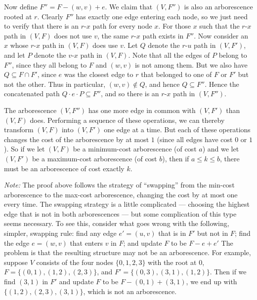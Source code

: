 \documentclass[12pt]{article}
\begin{document}
\begin{enumerate}
{Now define $F'' = F - (w,v) + e$.
We claim that $(V,F'')$ is also an arborescence rooted at $r$.
Clearly $F''$ has exactly one edge entering each node,
so we just need to verify that there is an $r$-$x$
path for every node $x$.
For those $x$ such that the $r$-$x$ path in $(V,F)$ does not
use $v$, the same $r$-$x$ path exists in $F''$.
Now consider an $x$ whose $r$-$x$ path in $(V,F)$ does use $v$.
Let $Q$ denote the $r$-$u$ path in $(V,F')$,
and let $P$ denote the $v$-$x$ path in $(V,F)$.
Note that all the edges of $P$ belong to $F''$, since
they all belong to $F$ and $(w,v)$ is not among them.
But we also have $Q \subseteq F \cap F'$, since
$e$ was the closest edge to $r$ that belonged to one 
of $F$ or $F'$ but not the other.
Thus in particular, $(w,v) \not\in Q$, and hence $Q \subseteq F''$.
Hence the concatenated path $Q \cdot e \cdot P \subseteq F''$,
and so there is an $r$-$x$ path in $(V,F'')$.

The arborescence $(V,F'')$ has one more edge in common
with $(V,F')$ than $(V,F)$ does.
Performing a sequence of these operations,
we can thereby transform $(V,F)$ into $(V,F')$ one edge at a time.
But each of these operations changes the cost of the
arborescence by at most $1$ (since all edges have cost $0$ or $1$).
So if we let $(V,F)$ be a minimum-cost arborescence (of cost $a$)
and we let $(V,F')$ be a maximum-cost arborescence (of cost $b$),
then if $a \leq k \leq b$, there must be an
arborescence of cost exactly $k$.

\medskip
{\em Note:} The proof above follows the strategy of 
``swapping'' from the min-cost arborescence to 
the max-cost arborescence, changing the cost by at most
one every time.
The swapping strategy is a little complicated --- choosing
the highest edge that is not in both arborescences ---
but some complication of this type seems necessary.
To see this, consider what goes wrong with the following,
simpler, swapping rule:
find any edge $e' = (u,v)$ that is in $F'$ but not in $F$;
find the edge $e = (w,v)$ that enters $v$ in $F$;
and update $F$ to be $F - e + e'$
The problem is that the resulting structure may not
be an arborescence.
For example, suppose $V$ consists of the four nodes $\{0, 1, 2, 3\}$
with the root at $0$, 
$F = \{(0,1), (1,2), (2,3)\}$,
and $F' = \{(0,3), (3,1), (1,2)\}$.
Then if we find $(3,1)$ in $F'$ and update $F$ to be $F - (0,1) + (3,1)$,
we end up with $\{(1,2), (2,3), (3,1)\}$, which is not an arborescence.

}





\end{enumerate}
\end{document}

